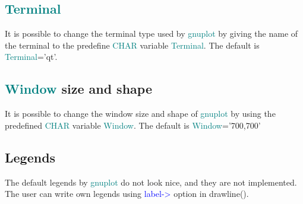 \subsection{\textcolor{teal}{Terminal}} 
\label{terminal} 
It is possible to change the terminal type used by \textcolor{teal}{gnuplot} by giving 
the name of the terminal to the predefine \textcolor{teal}{CHAR} variable \textcolor{teal}{Terminal}. 
The default is \newline \textcolor{teal}{Terminal}='qt'. 
\subsection{\textcolor{teal}{Window} size and shape} 
\label{window} 
It is possible to change the window size and shape of \textcolor{teal}{gnuplot} by 
using the predefined \textcolor{teal}{CHAR} variable \textcolor{teal}{Window}. 
The default is \newline 
\textcolor{teal}{Window}='700,700' 
\subsection{Legends} 
\label{legend} 
\item The default legends by \textcolor{teal}{gnuplot} do not look nice, and they are not implemented. 
The user can write own legends using \textcolor{blue}{label->} option in \textcolor{VioletRed}{drawline}(). 
